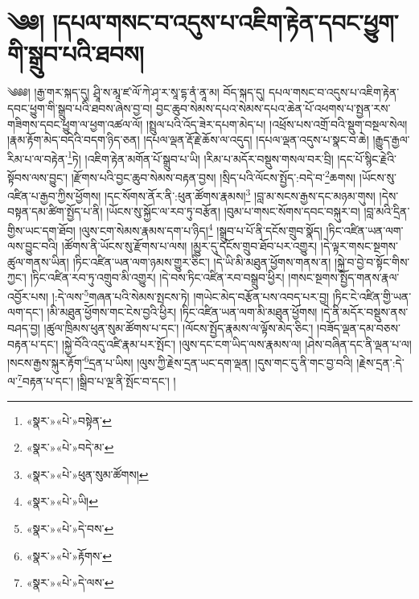 \chapter{༄༅། །དཔལ་གསང་བ་འདུས་པ་འཇིག་རྟེན་དབང་ཕྱུག་གི་སྒྲུབ་པའི་ཐབས།}༄༅༅། །རྒྱ་གར་སྐད་དུ། ཤྲཱི་ས་མཱ་ཛ་ལོ་ཀེ་ཤྭ་ར་སཱ་དྷ་ནཾ་ནཱ་མ། བོད་སྐད་དུ། དཔལ་གསང་བ་འདུས་པ་འཇིག་རྟེན་དབང་ཕྱུག་གི་སྒྲུབ་པའི་ཐབས་ཞེས་བྱ་བ། བྱང་ཆུབ་སེམས་དཔའ་སེམས་དཔའ་ཆེན་པོ་འཕགས་པ་སྤྱན་རས་གཟིགས་དབང་ཕྱུག་ལ་ཕྱག་འཚལ་ལོ། །སྤྲུལ་པའི་འོད་ཟེར་དཔག་མེད་པ། །འཕྲོས་པས་འགྲོ་བའི་སྡུག་བསྔལ་སེལ། །རྣམ་རྟོག་མེད་བདེའི་བདག་ཉིད་ཅན། །དཔལ་ལྡན་རྡོ་རྗེ་ཆོས་ལ་འདུད། །དཔལ་ལྡན་འདུས་པ་སྣང་བ་ཆེ། །རྒྱུད་རྒྱལ་རིམ་པ་ལ་བརྟེན་\footnote{«སྣར་»«པེ་»བསྟེན་}ཏེ། །འཇིག་རྟེན་མགོན་པོ་སྒྲུབ་པ་ཡི། །རིམ་པ་མདོར་བསྡུས་གསལ་བར་བྲི། །དང་པོ་སྙིང་རྗེའི་སྟོབས་ལས་བྱུང་། །རྫོགས་པའི་བྱང་ཆུབ་སེམས་བརྟན་བྱས། །སྲིད་པའི་ལོངས་སྤྱོད་:བདེ་བ་\footnote{«སྣར་»«པེ་»བདེ་མ་}ཆགས། །ཡོངས་སུ་འཛིན་པ་རྒྱབ་ཀྱིས་ཕྱོགས། །དང་སོགས་ནོར་ནི་:ཕུན་ཚོགས་རྣམས།\footnote{«སྣར་»«པེ་»ཕུན་སུམ་ཚོགས།} །བླ་མ་སངས་རྒྱས་དང་མཉམ་གུས། །དེས་བསྟན་དམ་ཚིག་སྤྱོད་པ་ནི། །ཡོངས་སུ་སྐྱོང་ལ་རབ་ཏུ་བརྩོན། །བུམ་པ་གསང་སོགས་དབང་བསྐུར་བ། །བླ་མའི་དྲིན་གྱིས་ཡང་དག་ཐོབ། །ལུས་ངག་སེམས་རྣམས་དག་པ་ཉིད།\footnote{«སྣར་»«པེ་»ཡི།} །སྒྲུབ་པ་པོ་ནི་དངོས་གྲུབ་སྣོད། །ཏིང་འཛིན་ཡན་ལག་ལས་བྱུང་བའི། །ཚོགས་ནི་ཡོངས་སུ་རྫོགས་པ་ལས། །མྱུར་དུ་དངོས་གྲུབ་ཐོབ་པར་འགྱུར། །དེ་ལྟར་གསང་སྔགས་ཚུལ་གནས་ཡིན། །ཏིང་འཛིན་ཡན་ལག་ཉམས་གྱུར་ཅིང་། །དེ་ཡི་མི་མཐུན་ཕྱོགས་གནས་ན། །སྐྱེ་བ་བྱེ་བ་སྟོང་གིས་ཀྱང་། །ཏིང་འཛིན་རབ་ཏུ་འགྲུབ་མི་འགྱུར། །དེ་བས་ཏིང་འཛིན་རབ་བསྒྲུབ་ཕྱིར། །གསང་སྔགས་སྤྱོད་གནས་རྣལ་འབྱོར་པས། །:དེ་ལས་\footnote{«སྣར་»«པེ་»དེ་བས་}གཞན་པའི་སེམས་སྤངས་ཏེ། །གཡེང་མེད་བརྩོན་པས་འབད་པར་བྱ། །ཏིང་ངེ་འཛིན་གྱི་ཡན་ལག་དང་། །མི་མཐུན་ཕྱོགས་གང་ངེས་བྱའི་ཕྱིར། །ཏིང་འཛིན་ཡན་ལག་མི་མཐུན་ཕྱོགས། །དེ་ནི་མདོར་བསྡུས་ནས་བཤད་བྱ། །ཚུལ་ཁྲིམས་ཕུན་སུམ་ཚོགས་པ་དང་། །ལོངས་སྤྱོད་རྣམས་ལ་ལྟོས་མེད་ཅིང་། །བཟོད་ལྡན་དམ་བཅས་བརྟན་པ་དང་། །སྐྱེ་བོའི་འདུ་འཛི་རྣམ་པར་སྤོང་། །ལུས་དང་ངག་ཡིད་ལས་རྣམས་ལ། །ཤེས་བཞིན་དང་ནི་ལྡན་པ་ལ། །སངས་རྒྱས་སྐུར་རྟོག་\footnote{«སྣར་»«པེ་»རྟོགས་}དྲན་པ་ཡིས། །ལུས་ཀྱི་རྗེས་དྲན་ཡང་དག་ལྡན། །དུས་གང་དུ་ནི་གང་བྱ་བའི། །རྗེས་དྲན་:དེ་ལ་\footnote{«སྣར་»«པེ་»དེ་ལས་}བརྟན་པ་དང་། །སྒྲིབ་པ་ལྔ་ནི་སྤོང་བ་དང་། །
